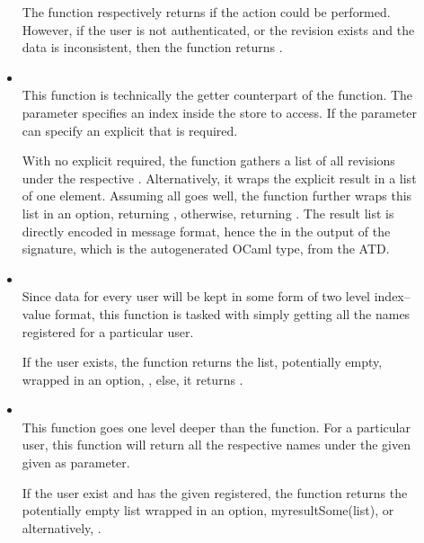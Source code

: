 \begin{description}
\begin{itemize}
  The function respectively returns  if the action could be performed. However, if the user is not authenticated, or the revision exists and the data is inconsistent, then the function returns .

  \item {} \\
  This function is technically the getter counterpart of the  function.
  The  parameter specifies an index inside the store to access.
  If the  parameter can specify an explicit  that is required.

  With no explicit  required, the function gathers a list of all revisions under the respective . Alternatively, it wraps the explicit result in a list of one element. Assuming all goes well, the function further wraps this list in an option, returning , otherwise, returning . The result list is directly encoded in message format, hence the  in the output of the signature, which is the autogenerated OCaml type, from the ATD.

  \item {} \\
  Since data for every user will be kept in some form of two level index--value format, this function is tasked with simply getting all the  names registered for a particular user.

  If the user exists, the function returns the list, potentially empty, wrapped in an option, , else, it returns .

  \item {} \\
  This function goes one level deeper than the  function.
  For a particular user, this function will return all the respective  names under the given  given as parameter.

  If the user exist and has the given  registered, the function returns the potentially empty list wrapped in an option, myresult{Some(list)}, or alternatively, .


\end{itemize}
\end{description}
